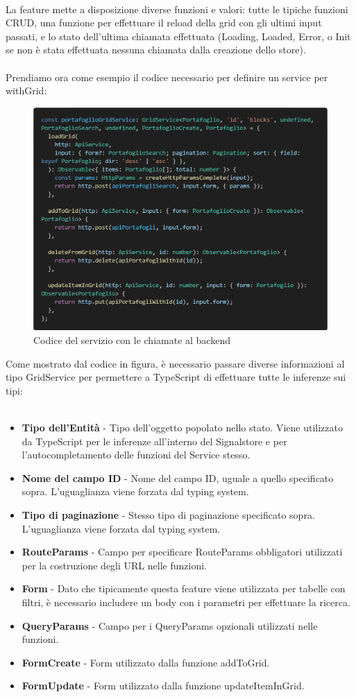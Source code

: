 \textbf{}\\
La feature mette a disposizione diverse funzioni e valori: tutte le tipiche funzioni CRUD, una funzione per effettuare il reload della grid con gli ultimi input passati,
e lo stato dell'ultima chiamata effettuata (Loading, Loaded, Error, o Init se non \`e stata effettuata nessuna chiamata dalla creazione dello store).
\\\\
Prendiamo ora come esempio il codice necessario per definire un service per withGrid:
\begin{figure}[H]
  \centering
  \includegraphics[width=12cm]{images/code-service.png}
  \caption{Codice del servizio con le chiamate al backend}
\end{figure}
Come mostrato dal codice in figura, \`e necessario passare diverse informazioni al tipo GridService per permettere a TypeScript di effettuare tutte le inferenze sui tipi:
\\\\
\begin{itemize}
  \item \textbf{Tipo dell'Entit\`a} - Tipo dell'oggetto popolato nello stato. Viene utilizzato da TypeScript per le inferenze all'interno del Signalstore e
    per l'autocompletamento delle funzioni del Service stesso.
  \item \textbf{Nome del campo ID} - Nome del campo ID, uguale a quello specificato sopra. L'uguaglianza viene forzata dal typing system.
  \item \textbf{Tipo di paginazione} - Stesso tipo di paginazione specificato sopra. L'uguaglianza viene forzata dal typing system.
  \item \textbf{RouteParams} - Campo per specificare RouteParams obbligatori utilizzati per la costruzione degli URL nelle funzioni.
  \item \textbf{Form} - Dato che tipicamente questa feature viene utilizzata per tabelle con filtri, \`e necessario includere un body con i parametri per effettuare la ricerca.
  \item \textbf{QueryParams} - Campo per i QueryParams opzionali utilizzati nelle funzioni.
  \item \textbf{FormCreate} - Form utilizzato dalla funzione addToGrid.
  \item \textbf{FormUpdate} - Form utilizzato dalla funzione updateItemInGrid.
\end{itemize}
